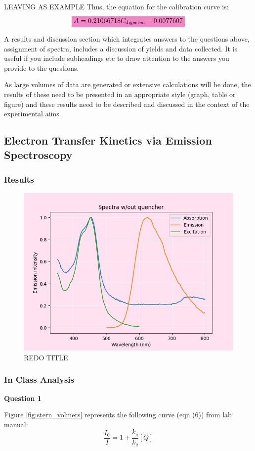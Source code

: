 \documentclass[main.tex]{subfiles}
\begin{document}
LEAVING AS EXAMPLE
Thus, the equation for the calibration curve is:
\begin{equation*}
    \mathcolorbox{Lavender}{A = 0.21066718C_{\text{digested}} -0.0077607}
\end{equation*}

A results and discussion section which integrates answers to the questions above, assignment of spectra, 
includes a discussion of yields and data collected. It is useful if you include subheadings etc to draw attention to 
the answers you provide to the questions.

As large volumes of data are generated or extensive calculations will be done, the results of these need 
to be presented in an appropriate style (graph, table or figure) and these results need to be described 
and discussed in the context of the experimental aims.

\subsection{Electron Transfer Kinetics via Emission Spectroscopy}
\subsubsection*{Results}
\begin{figure}[H]
    \centering
    \includegraphics[width = 0.7\linewidth]{part1_noq.png}
    \caption{REDO TITLE}
    \label{fig:enter-label}
\end{figure}
\subsubsection*{In Class Analysis}
\textbf{Question 1} 


Figure \ref{fig:stern_volmers} represents the following curve (eqn (6)) from lab manual\autocite{lab_manual}:
\begin{equation*}
    \frac{I_0}{I} = 1 + \frac{k_q}{k_q}[Q]
\end{equation*}
\end{document}
